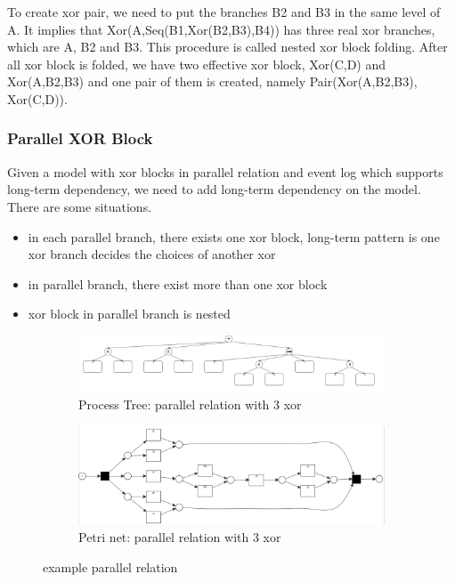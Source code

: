 \documentclass[]{article}
\begin{document}
To create xor pair, we need to put the branches B2 and B3 in the same level of A. It implies that Xor(A,Seq(B1,Xor(B2,B3),B4)) has three real xor branches, which are A, B2 and B3. This procedure is called nested xor block folding. After all xor block is folded, we have two effective xor block, Xor(C,D) and Xor(A,B2,B3) and one pair of them is created, namely Pair(Xor(A,B2,B3), Xor(C,D)).
\subsubsection{Parallel XOR Block}
Given a model with xor blocks in parallel relation and event log which supports long-term dependency, we need to add long-term dependency on the model. There are some situations.
\begin{itemize}
	\item in each parallel branch, there exists one xor block, long-term pattern is one xor branch decides the choices of another xor
	\item in parallel branch, there exist more than one xor block
	\item xor block in parallel branch is nested
\end{itemize}
\begin{figure}[h]
	\centering
	\begin{subfigure}[b]{\textwidth}
		\centering
		\includegraphics[width=\linewidth]{PT07_And_4_xor_notnested.png}
		\caption{Process Tree: parallel relation with 3 xor}
		\label{fig:pt_and_4_xor}
	\end{subfigure}
	\vfill
	\begin{subfigure}[b]{\textwidth}
		\centering
		\includegraphics[width=\linewidth]{PN07_And_4_xor_notnested.png}
		\caption{Petri net: parallel relation with 3 xor}
		\label{fig:pn_and_4_xor}
	\end{subfigure}
	\caption{example parallel relation}
	\label{fig:and_situation}
\end{figure}
\end{document}
